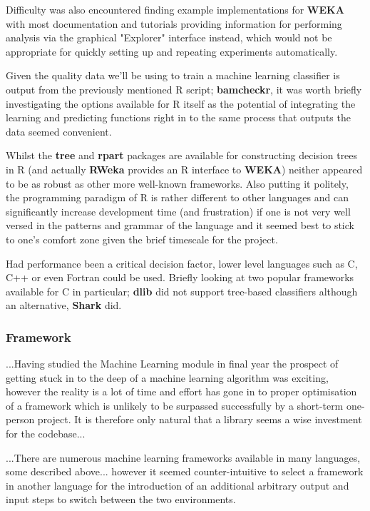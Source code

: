Difficulty was also encountered finding example implementations for \textbf{WEKA}
with most documentation and tutorials providing information for performing
analysis via the graphical "Explorer" interface instead, which would not be
appropriate for quickly setting up and repeating experiments automatically.

Given the quality data we'll be using to train a machine learning classifier is
output from the previously mentioned R script; \textbf{bamcheckr}, it was worth
briefly investigating the options available for R itself as the potential of
integrating the learning and predicting functions right in to the same process
that outputs the data seemed convenient.

Whilst the \textbf{tree}\citep{man:rtree} and \textbf{rpart}\citep{man:rpart}
packages are available for constructing decision trees in R (and actually
\textbf{RWeka} provides an R interface to \textbf{WEKA}) neither appeared to be
as robust as other more well-known frameworks. Also putting it politely, the
programming paradigm of R\citep{man:R} is rather different to other languages
and can significantly increase development time (and frustration\citep{argh}) if
one is not very well versed in the patterns and grammar of the language  and it
seemed best to stick to one's comfort zone given the brief timescale for the
project.

Had performance been a critical decision factor, lower level languages such as
C, C++ or even Fortran could be used. Briefly looking at two popular frameworks
available for C in particular; \textbf{dlib} did not support tree-based
classifiers although an alternative, \textbf{Shark} did.


\subsubsection{Framework}
...Having studied the Machine Learning module in final year the prospect of
getting stuck in to the deep of a machine learning algorithm was exciting,
however the reality is a lot of time and effort has gone in to proper
optimisation of a framework which is unlikely to be surpassed successfully by a
short-term one-person project. It is therefore only natural that a library seems
a wise investment for the codebase...

...There are numerous machine learning frameworks available in many languages,
some described above... however it seemed counter-intuitive to select a
framework in another language for the introduction of an additional arbitrary
output and input steps to switch between the two environments.

